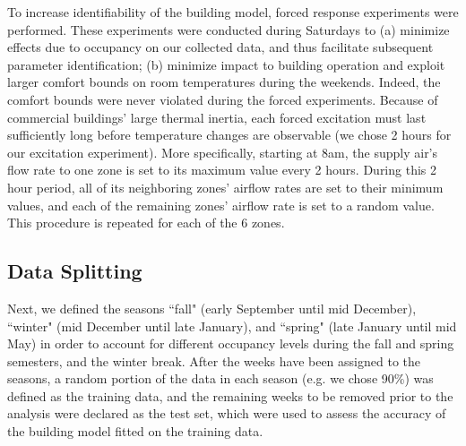 To increase identifiability of the building model, forced response experiments were performed. These experiments were conducted during Saturdays to (a) minimize effects due to occupancy on our collected data, and thus facilitate subsequent parameter identification; (b) minimize impact to building operation and exploit larger comfort bounds on room temperatures during the weekends. Indeed, the comfort bounds were never violated during the forced experiments. 
Because of commercial buildings' large thermal inertia, each forced excitation must last sufficiently long before temperature changes are observable (we chose 2 hours for our excitation experiment).
More specifically, starting at 8am, the supply air's flow rate to one zone is set to its maximum value every 2 hours. During this 2 hour period, all of its neighboring zones' airflow rates are set to their minimum values, and each of the remaining zones' airflow rate is set to a random value. 
This procedure is repeated for each of the 6 zones. 



\subsection{Data Splitting}
Next, we defined the seasons ``fall" (early September until mid December), ``winter" (mid December until late January), and ``spring" (late January until mid May) in order to account for different occupancy levels during the fall and spring semesters, and the winter break. After the weeks have been assigned to the seasons, a random portion of the data in each season (e.g. we chose 90\%) was defined as the training data, and the remaining weeks to be removed prior to the analysis were declared as the test set, which were used to assess the accuracy of the building model fitted on the training data.

